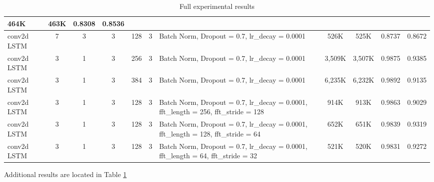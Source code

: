 \documentclass{article}
\begin{document}
\begin{table}[!htbp]
{\begin{tabular} { |m{3cm}|c|c|c|c|c|m{3cm}|c|c|c|c| }
      464K & 463K & 0.8308 & 0.8536 \\ \hline
      conv2d LSTM & 7 & 3 & 3 &
      128 & 3 & Batch Norm, Dropout = 0.7, lr\_decay = 0.0001 &
      526K & 525K & 0.8737 & 0.8672 \\ \hline
      \hline
      conv2d LSTM & 3 & 1 & 3 &
      256 & 3 & Batch Norm, Dropout = 0.7, lr\_decay = 0.0001 &
      3,509K & 3,507K & 0.9875 & 0.9385 \\ \hline
      conv2d LSTM & 3 & 1 & 3 &
      384 & 3 & Batch Norm, Dropout = 0.7, lr\_decay = 0.0001 &
      6,235K & 6,232K & 0.9892 & 0.9135 \\ \hline
      \hline
      conv2d LSTM & 3 & 1 & 3 &
      128 & 3 & Batch Norm, Dropout = 0.7, lr\_decay = 0.0001,
      fft\_length = 256, fft\_stride = 128 &
      914K & 913K & 0.9863 & 0.9029 \\ \hline
      conv2d LSTM & 3 & 1 & 3 &
      128 & 3 & Batch Norm, Dropout = 0.7, lr\_decay = 0.0001,
      fft\_length = 128, fft\_stride = 64 &
      652K & 651K & 0.9839 & 0.9319 \\ \hline
      conv2d LSTM & 3 & 1 & 3 &
      128 & 3 & Batch Norm, Dropout = 0.7, lr\_decay = 0.0001,
      fft\_length = 64, fft\_stride = 32 &
      521K & 520K & 0.9831 & 0.9272 \\ \hline
      
    \end{tabular}
  }
  \caption{Full experimental results}
  \label{tab:full_results}
\end{table}
Additional results are located in Table \ref{tab:full_results}


{}

\end{document}
